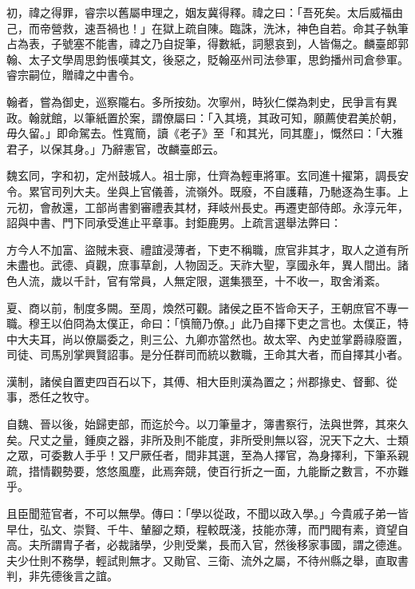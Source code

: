 \begin{pinyinscope}
 初，禕之得罪，睿宗以舊屬申理之，姻友冀得釋。禕之曰：「吾死矣。太后威福由己，而帝營救，速吾禍也！」在獄上疏自陳。臨誅，洗沐，神色自若。命其子執筆占為表，子號塞不能書，禕之乃自捉筆，得數紙，詞懇哀到，人皆傷之。麟臺郎郭翰、太子文學周思鈞悵嘆其文，後惡之，貶翰巫州司法參軍，思鈞播州司倉參軍。睿宗嗣位，贈禕之中書令。



 翰者，嘗為御史，巡察隴右。多所按劾。次寧州，時狄仁傑為刺史，民爭言有異政。翰就館，以筆紙置於案，謂僚屬曰：「入其境，其政可知，願薦使君美於朝，毋久留。」即命駕去。性寬簡，讀《老子》至「和其光，同其塵」，慨然曰：「大雅君子，以保其身。」乃辭憲官，改麟臺郎云。



 魏玄同，字和初，定州鼓城人。祖士廓，仕齊為輕車將軍。玄同進十擢第，調長安令。累官司列大夫。坐與上官儀善，流嶺外。既廢，不自護藉，乃馳逐為生事。上元初，會赦還，工部尚書劉審禮表其材，拜岐州長史。再遷吏部侍郎。永淳元年，詔與中書、門下同承受進止平章事。封鉅鹿男。上疏言選舉法弊曰：



 方今人不加富、盜賊未衰、禮誼浸薄者，下吏不稱職，庶官非其才，取人之道有所未盡也。武德、貞觀，庶事草創，人物固乏。天祚大聖，享國永年，異人間出。諸色人流，歲以千計，官有常員，人無定限，選集猥至，十不收一，取舍淆紊。



 夏、商以前，制度多闕。至周，煥然可觀。諸侯之臣不皆命天子，王朝庶官不專一職。穆王以伯冏為太僕正，命曰：「慎簡乃僚。」此乃自擇下吏之言也。太僕正，特中大夫耳，尚以僚屬委之，則三公、九卿亦當然也。故太宰、內史並掌爵祿廢置，司徒、司馬別掌興賢詔事。是分任群司而統以數職，王命其大者，而自擇其小者。



 漢制，諸侯自置吏四百石以下，其傅、相大臣則漢為置之；州郡掾史、督郵、從事，悉任之牧守。



 自魏、晉以後，始歸吏部，而迄於今。以刀筆量才，簿書察行，法與世弊，其來久矣。尺丈之量，鍾庾之器，非所及則不能度，非所受則無以容，況天下之大、士類之眾，可委數人手乎！又尸厥任者，間非其選，至為人擇官，為身擇利，下筆系親疏，措情觀勢要，悠悠風塵，此焉奔競，使百行折之一面，九能斷之數言，不亦難乎。



 且臣聞蒞官者，不可以無學。傳曰：「學以從政，不聞以政入學。」今貴戚子弟一皆早仕，弘文、崇賢、千牛、輦腳之類，程較既淺，技能亦薄，而門閥有素，資望自高。夫所謂胄子者，必裁諸學，少則受業，長而入官，然後移家事國，謂之德進。夫少仕則不務學，輕試則無才。又勛官、三衛、流外之屬，不待州縣之舉，直取書判，非先德後言之誼。




\end{pinyinscope}
